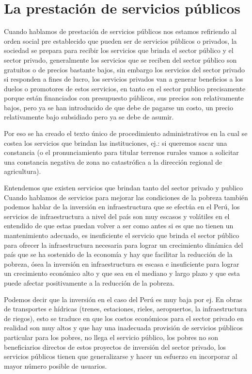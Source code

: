 \documentclass[
  letterpaper,
  DIV=11,
  numbers=noendperiod]{scrartcl}
\begin{document}
\hypertarget{la-prestaciuxf3n-de-servicios-puxfablicos}{%
\section{La prestación de servicios
públicos}\label{la-prestaciuxf3n-de-servicios-puxfablicos}}

Cuando hablamos de prestación de servicios públicos nos estamos
refiriendo al orden social pre establecido que pueden ser de servicios
públicos o privados, la sociedad se prepara para recibir los servicios
que brinda el sector público y el sector privado, generalmente los
servicios que se reciben del sector público son gratuitos o de precios
bastante bajos, sin embargo los servicios del sector privado si
responden a fines de lucro, los servicios privados van a generar
beneficios a los duelos o promotores de estos servicios, en tanto en el
sector publico precisamente porque están financiados con presupuesto
públicos, sus precios son relativamente bajos, pero ya se han
introducido de que debe de pagarse un costo, un precio relativamente
bajo subsidiado pero ya se debe de asumir.

Por eso se ha creado el texto único de procedimiento administrativos en
la cual se costea los servicios que brindan las instituciones, ej.: si
queremos sacar una constancia (o el pronunciamiento para titular
terrenos rurales vamos a solicitar una constancia negativa de zona no
catastrófica a la dirección regional de agricultura).

Entendemos que existen servicios que brindan tanto del sector privado y
publico Cuando hablamos de servicios para mejorar las condiciones de la
pobreza también podemos hablar de la inversión en infraestructura que se
efectúa en el Perú, los servicios de infraestructura a nivel del país
son muy escasos y volátiles en el entendido de que estas puedan volver a
ser como antes si es que no tienen un mantenimiento adecuado, es
insuficiente el servicio que brinda el sector público para ofrecer la
infraestructura necesaria para lograr un crecimiento dinámica del país
que se ha sostenido de la economía y hay que facilitar la reducción de
la pobreza, ósea la inversión en infraestructura es escasa e
insuficiente para lograr un crecimiento económico alto y que sea en el
mediano y largo plazo y que esta puede afectar positivamente a la
reducción de la pobreza.

Podemos decir que la inversión en el caso del Perú es muy baja por ej.
En obras de transportes e hídricas (trenes, estaciones, rieles,
aeropuertos, la infraestructura de riegos), esto se traduce en que los
costos económicos para el sector privado en realidad son muy altos y que
hay una inadecuada provisión de servicios públicos particular para los
pobres, no llega el servicio público, los pobres no son beneficiarios
directos de estos proyectos de inversión del sector privado, los
servicios públicos tienen que generalizarse y hacer un esfuerzo en
incorporar al mayor número posible de usuarios.
\end{document}
